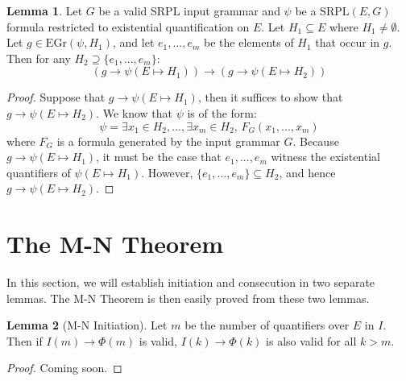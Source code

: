 \documentclass[12pt]{article}
\theoremstyle{definition}
\newtheorem{lemma}{Lemma}
\theoremstyle{remark}
\newcommand{\gr}{\text{EGr}}
\newcommand{\SRPL}{\text{SRPL}}
\begin{document}
\begin{lemma}
  \label{lem:exists-lower}
  Let $G$ be a valid SRPL input grammar and $\psi$ be a $\SRPL(E,G)$ formula restricted to existential quantification on $E$.  Let $H_1 \subseteq E$ where $H_1 \neq \emptyset$.  Let $g \in \gr(\psi,H_1)$, and let $e_1,...,e_m$ be the elements of $H_1$ that occur in $g$.  Then for any $H_2 \supseteq \{e_1,...,e_m\}$:
  $$(g \rightarrow \psi(E \mapsto H_1)) \rightarrow (g \rightarrow \psi(E \mapsto H_2))$$
\end{lemma}
\begin{proof}
  Suppose that $g \rightarrow \psi(E \mapsto H_1)$, then it suffices to show that $g \rightarrow \psi(E \mapsto H_2)$.  We know that $\psi$ is of the form:
  $$\psi = \exists x_1 \in H_2,...,\exists x_m \in H_2, \, F_G(x_1,...,x_m)$$
  where $F_G$ is a formula generated by the input grammar $G$.  Because $g \rightarrow \psi(E \mapsto H_1)$, it must be the case that $e_1,...,e_m$ witness the existential quantifiers of $\psi(E \mapsto H_1)$.  However, $\{e_1,...,e_m\} \subseteq H_2$, and hence $g \rightarrow \psi(E \mapsto H_2)$.
\end{proof}



\section{The M-N Theorem}

In this section, we will establish initiation and consecution in two separate lemmas.  The M-N Theorem is then easily proved from these two lemmas.

\begin{lemma}[M-N Initiation]
  \label{ref:initiation}
  Let $m$ be the number of quantifiers over $E$ in $I$.  Then if $I(m) \rightarrow \Phi(m)$ is valid, $I(k) \rightarrow \Phi(k)$ is also valid for all $k>m$.
\end{lemma}
\begin{proof}
  Coming soon.
\end{proof}
\end{document}
